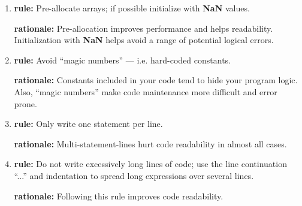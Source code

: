 \documentclass{tufte-book}
\begin{document}
\begin{enumerate}
\item \textbf{rule:} Pre-allocate arrays; if possible initialize with \textbf{NaN} values.

\textbf{rationale:} Pre-allocation improves performance and helps readability. Initialization with \textbf{NaN} helps avoid a range of potential logical errors.

\item \textbf{rule:} Avoid ``magic numbers'' --- i.e. hard-coded constants.

\textbf{rationale:} Constants included in your code tend to hide your program logic. Also, ``magic numbers'' make code maintenance more difficult and error prone.

\item \textbf{rule:} Only write one statement per line.

\textbf{rationale:} Multi-statement-lines hurt code readability in almost all cases.

\item \textbf{rule:} Do not write excessively long lines of code; use the line continuation ``...'' and indentation to spread long expressions over several lines.

\textbf{rationale:} Following this rule improves code readability.
\end{enumerate}













\printindex
\end{document}
